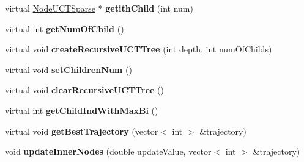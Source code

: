 \begin{DoxyCompactItemize}
\item 
\hypertarget{classMultiBoost_1_1InnerNodeUCTSparse_a41f9a0c2e728d014aa5c47f13b66d2f1}{virtual \hyperlink{classMultiBoost_1_1NodeUCTSparse}{Node\-U\-C\-T\-Sparse} $\ast$ {\bfseries getith\-Child} (int num)}\label{classMultiBoost_1_1InnerNodeUCTSparse_a41f9a0c2e728d014aa5c47f13b66d2f1}

\item 
\hypertarget{classMultiBoost_1_1InnerNodeUCTSparse_ac6084be399608cb1bf1f8d8711d5a159}{virtual int {\bfseries get\-Num\-Of\-Child} ()}\label{classMultiBoost_1_1InnerNodeUCTSparse_ac6084be399608cb1bf1f8d8711d5a159}

\item 
\hypertarget{classMultiBoost_1_1InnerNodeUCTSparse_aa3992af18473a2f7d9053834522b8181}{virtual void {\bfseries create\-Recursive\-U\-C\-T\-Tree} (int depth, int num\-Of\-Childs)}\label{classMultiBoost_1_1InnerNodeUCTSparse_aa3992af18473a2f7d9053834522b8181}

\item 
\hypertarget{classMultiBoost_1_1InnerNodeUCTSparse_a8e92241ea5a33183e811d649e9747f2e}{virtual void {\bfseries set\-Children\-Num} ()}\label{classMultiBoost_1_1InnerNodeUCTSparse_a8e92241ea5a33183e811d649e9747f2e}

\item 
\hypertarget{classMultiBoost_1_1InnerNodeUCTSparse_ab0c394361cb78bfcba06a22be08ef5eb}{virtual void {\bfseries clear\-Recursive\-U\-C\-T\-Tree} ()}\label{classMultiBoost_1_1InnerNodeUCTSparse_ab0c394361cb78bfcba06a22be08ef5eb}

\item 
\hypertarget{classMultiBoost_1_1InnerNodeUCTSparse_a87937be9c0e19fe6f4364e6104efd7a3}{virtual int {\bfseries get\-Child\-Ind\-With\-Max\-Bi} ()}\label{classMultiBoost_1_1InnerNodeUCTSparse_a87937be9c0e19fe6f4364e6104efd7a3}

\item 
\hypertarget{classMultiBoost_1_1InnerNodeUCTSparse_a76c4343f9ecc6a10f9ac55fe20536239}{virtual void {\bfseries get\-Best\-Trajectory} (vector$<$ int $>$ \&trajectory)}\label{classMultiBoost_1_1InnerNodeUCTSparse_a76c4343f9ecc6a10f9ac55fe20536239}

\item 
\hypertarget{classMultiBoost_1_1InnerNodeUCTSparse_a424624e87564a71ab8a7fc94a71f804b}{void {\bfseries update\-Inner\-Nodes} (double update\-Value, vector$<$ int $>$ \&trajectory)}\label{classMultiBoost_1_1InnerNodeUCTSparse_a424624e87564a71ab8a7fc94a71f804b}

\end{DoxyCompactItemize}

